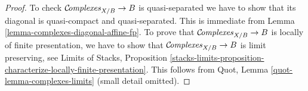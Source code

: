 \begin{proof}
To check $\mathcal{C}\!\mathit{omplexes}_{X/B} \to B$ is quasi-separated we have to
show that its diagonal is quasi-compact and quasi-separated.
This is immediate from Lemma \ref{lemma-complexes-diagonal-affine-fp}.
To prove that $\mathcal{C}\!\mathit{omplexes}_{X/B} \to B$ is locally of finite
presentation, we have to show that $\mathcal{C}\!\mathit{omplexes}_{X/B} \to B$
is limit preserving, see
Limits of Stacks, Proposition
\ref{stacks-limits-proposition-characterize-locally-finite-presentation}.
This follows from Quot, Lemma \ref{quot-lemma-complexes-limits}
(small detail omitted).
\end{proof}











